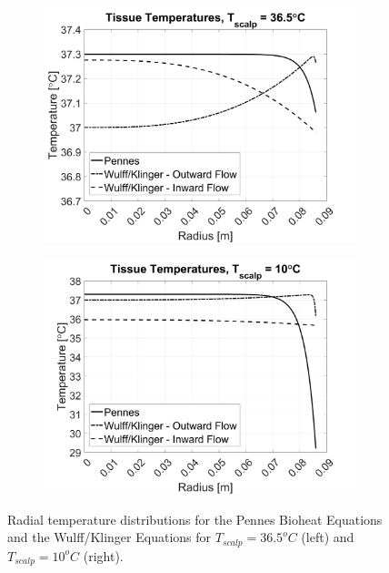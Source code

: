 \documentclass[11pt,english,a4paper,twoside,openright]{report}
\begin{document}
{{{{{{{{\begin{figure}[h]
	\centering
	\begin{subfigure}[b]{0.49\textwidth}
		\includegraphics[width=\textwidth]{1DHemisphere/figure1}
	\end{subfigure}
	\begin{subfigure}[b]{0.49\textwidth}
		\includegraphics[width=\textwidth]{1DHemisphere/figure2}
	\end{subfigure}
	\caption[Radial temperature distributions for the Pennes Bioheat Equations and the Wulff/Klinger Equations for $T_{scalp}=36.5^{o}C$ and $T_{scalp}=10^{o}C$]{Radial temperature distributions for the Pennes Bioheat Equations and the Wulff/Klinger Equations for $T_{scalp}=36.5^{o}C$ (left) and $T_{scalp}=10^{o}C$ (right).}
	\label{fig:Results1}
\end{figure}

}}}}}}}}
\end{document}
